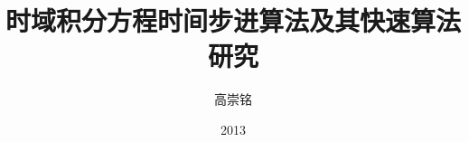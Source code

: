 \documentclass[bachelor]{uestcthesis}
\title{时域积分方程时间步进算法及其快速算法研究}
\author{高崇铭}
\date{2013}{4}{15}
\begin{document}
\newcommand{\red}[1]{{\textcolor{red}{{} #1}}}
\newcommand{\ud}{\,\mathrm{d}}
\newcommand{\bt}{\vrule width 0.85pt}
\newcommand{\CoSync}{\emph{CoSync}}
\newcommand{\Sync}{\emph{Sync}}
\newcommand{\cosync}{\emph{CoSync}}
\newcommand{\sync}{\emph{Sync}}





\end{document}
